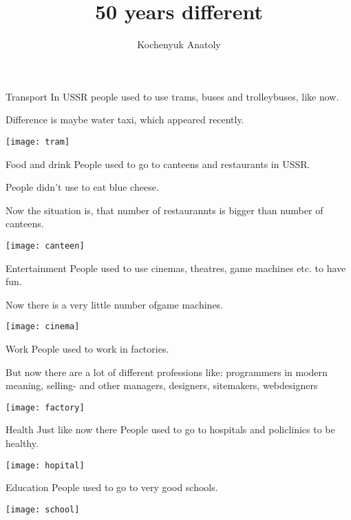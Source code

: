\documentclass[11pt]{beamer}
\author{Kochenyuk Anatoly}
\title{50 years different}
\begin{document}
 
 \begin{frame}
 \titlepage
 \end{frame}
 
 
 \begin{frame}{Transport}
 	In USSR people used to use trams, buses and trolleybuses, like now.
 	
 	Difference is maybe water taxi, which appeared recently.
 	\begin{center}
 	\texttt{[image: tram]}
 	\end{center}
 \end{frame}
 
 \begin{frame}{Food and drink}
 	People used to go to canteens and restaurants in USSR.
 	
 	People didn't use to eat blue cheese.
 	
 	
 	Now the situation is, that number of restaurannts is bigger than number of canteens. 
 	\begin{center}
 	\texttt{[image: canteen]}
 	\end{center}
 \end{frame}
 
 \begin{frame}{Entertainment}
 	People used to use cinemas, theatres, game machines etc. to have fun.
 	
 	Now there is a very little number ofgame machines.
 	\begin{center}
 	\texttt{[image: cinema]}
 	\end{center}
 \end{frame}
 
 \begin{frame}{Work}
	People used to work in factories.
	
	But now there are a lot of different professions like:  programmers in modern meaning, selling- and other managers, designers, sitemakers, webdesigners
	\begin{center}
	 	\texttt{[image: factory]}
	 \end{center} 	
 \end{frame}
 
\begin{frame}{Health}
	Just like now there People used to go to hospitals and policlinics to be healthy.
	\begin{center}
	\texttt{[image: hopital]}
	\end{center}
\end{frame} 

\begin{frame}{Education}
	People used to go to very good schools.
	\begin{center}
	\texttt{[image: school]}
	\end{center}
\end{frame}
 
  
\end{document}
